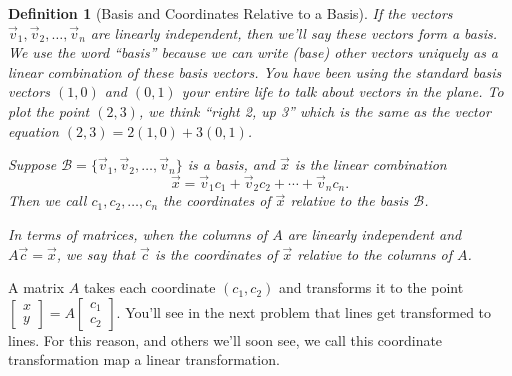 \documentclass[letterpaper,oneside]{book}%
\theoremstyle{plain}
\theoremstyle{box}
\newtheorem{definition}[theorem]{Definition}
\theoremstyle{problem}
\newcommand{\bvec}[1]{\begin{bmatrix} #1 \end{bmatrix}}
\begin{document}
\begin{definition}[Basis and Coordinates Relative to a Basis]
 If the vectors $\vec v_1, \vec v_2,\ldots,\vec v_n$ are linearly independent, then we'll say these vectors form a basis.  
 We use the word ``basis'' because we can write (base) other vectors uniquely as a linear combination of these basis vectors.  You have been using the standard basis vectors $(1,0)$ and $(0,1)$ your entire life to talk about vectors in the plane. To plot the point $(2,3)$, we think ``right 2, up 3'' which is the same as the vector equation $(2,3)=2(1,0)+3(0,1)$. 

 Suppose $\mathscr{B}=\{\vec v_1, \vec v_2, \ldots, \vec v_n\}$ is a basis, and $\vec x$ is the linear combination
 $$\vec x = \vec v_1c_1+\vec v_2c_2+\cdots +\vec v_n c_n.$$
 Then we call $c_1, c_2, \ldots,c_n$ the coordinates of $\vec x$ relative to the basis $\mathscr{B}$. 
 
 In terms of matrices, when the columns of $A$ are linearly independent and $A\vec c=\vec x$, we say that $\vec c$ is the  coordinates of $\vec x$ relative to the columns of $A$. 
\end{definition}

A matrix $A$ takes each coordinate $(c_1,c_2)$ and transforms it to the point $\bvec{x\\y}=A\bvec{c_1\\c_2}$. You'll see in the next problem that lines get transformed to lines. For this reason, and others we'll soon see,  we call this coordinate transformation map a linear transformation. 
\end{document}
